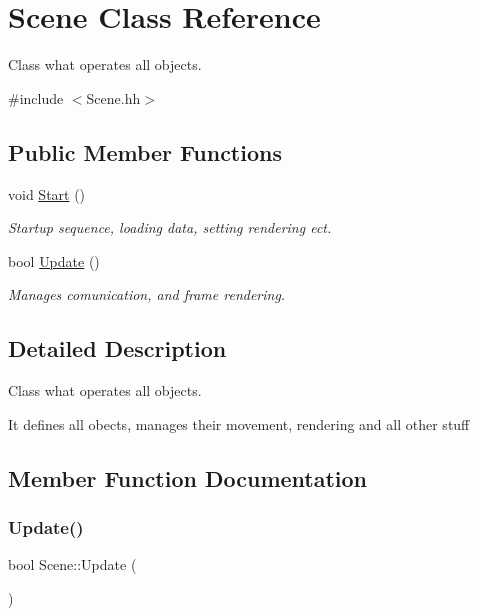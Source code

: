 \hypertarget{class_scene}{}\section{Scene Class Reference}
\label{class_scene}


Class what operates all objects.  




{\ttfamily \#include $<$Scene.\+hh$>$}

\subsection*{Public Member Functions}
\begin{DoxyCompactItemize}
\item 
\mbox{\label{class_scene_a31e0e1b9ce39bd9f5ec160835cc94d44}} 
void \hyperlink{class_scene_a31e0e1b9ce39bd9f5ec160835cc94d44}{Start} ()
\begin{DoxyCompactList}\small\item\em Startup sequence, loading data, setting rendering ect. \end{DoxyCompactList}\item 
bool \hyperlink{class_scene_a801a2a44d914c88ecfbb953cc3e1c00a}{Update} ()
\begin{DoxyCompactList}\small\item\em Manages comunication, and frame rendering. \end{DoxyCompactList}\end{DoxyCompactItemize}


\subsection{Detailed Description}
Class what operates all objects. 

It defines all obects, manages their movement, rendering and all other stuff 

\subsection{Member Function Documentation}
\mbox{\label{class_scene_a801a2a44d914c88ecfbb953cc3e1c00a}} 
\subsubsection{\texorpdfstring{Update()}{Update()}}
{\footnotesize\ttfamily bool Scene\+::\+Update (\begin{DoxyParamCaption}{ }\end{DoxyParamCaption})}



